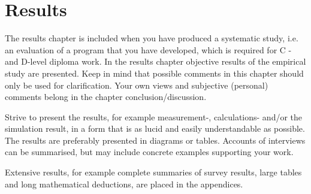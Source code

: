 \section{Results}
\label{ch:results}
\noindent	
The results chapter is included when you have produced a systematic study, i.e. an evaluation of a program that you have developed, which is required for C - and D-level diploma work. In the results chapter objective results of the empirical study are presented. Keep in mind that possible comments in this chapter should only be used for clarification. Your own views and subjective (personal) comments belong in the chapter conclusion/discussion.

Strive to present the results, for example measurement-, calculations- and/or the simulation result, in a form that is as lucid and easily understandable as possible. The results are preferably presented in diagrams or tables. Accounts of interviews can be summarised, but may include concrete examples supporting your work.

Extensive results, for example complete summaries of survey results, large tables and long mathematical deductions, are placed in the appendices.
